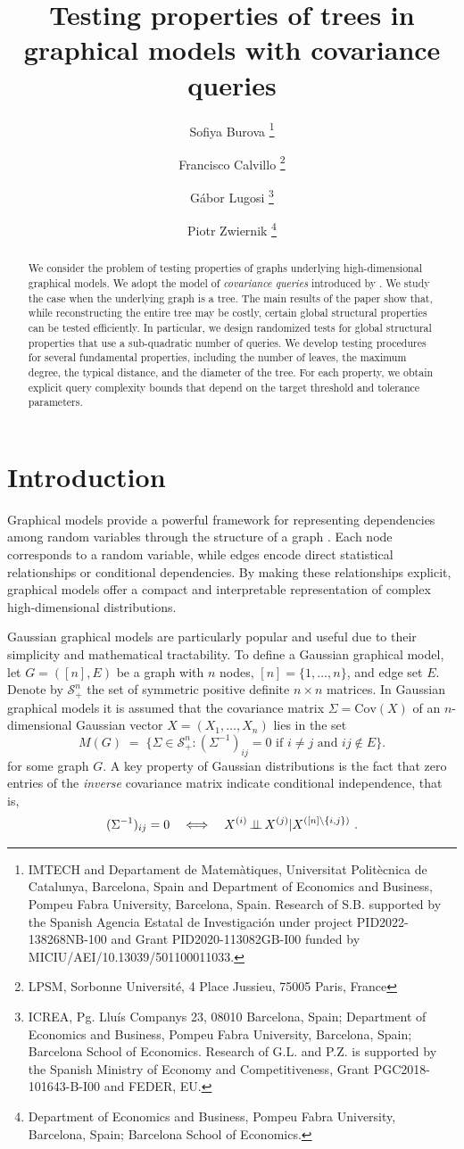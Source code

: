 \documentclass[12pt]{article}
\title{Testing properties of trees in graphical models with covariance queries}
\author{Sofiya Burova 
\thanks{
IMTECH and Departament de Matem\`atiques,  Universitat Polit\`ecnica de Catalunya, Barcelona, Spain 
and 
Department of Economics and Business, Pompeu Fabra University, Barcelona, Spain.
Research of S.B. supported by the Spanish Agencia Estatal de Investigaci\'on under project PID2022-138268NB-100 and Grant PID2020-113082GB-I00 funded by MICIU/AEI/10.13039/501100011033.}
\and Francisco Calvillo 
\thanks{LPSM, Sorbonne Université, 4 Place Jussieu, 75005 Paris, France}
\and Gábor Lugosi  
\thanks{ICREA, Pg. Llu\'is Companys 23, 08010 Barcelona, Spain;
Department of Economics and Business, Pompeu Fabra University, Barcelona, Spain; 
Barcelona School of Economics.
Research of G.L. and P.Z. is supported by the Spanish Ministry of Economy and Competitiveness, Grant PGC2018-101643-B-I00 and FEDER, EU.}
\and Piotr Zwiernik
\thanks{Department of Economics and Business, Pompeu Fabra University, Barcelona, Spain; 
Barcelona School of Economics.}
}
\date{}
\newcommand{\cov}{\mathrm{Cov}}
\newcommand{\cip}{\mbox{\,$\perp\!\!\!\perp$\,}}
\newcommand{\indep}{\cip}
\begin{document}
\maketitle
\begin{abstract}
We consider the problem of testing properties of graphs underlying high-dimensional graphical models. We adopt the model of \emph{covariance queries} introduced by \cite{lugosi2021learning}. 
We study the case when the underlying graph is a tree. 
The main results of the paper show that, while reconstructing the entire tree may be costly, certain global structural properties can be tested efficiently. 
In particular, we design randomized tests for global structural properties that  use a sub-quadratic number of queries. We develop testing procedures for several fundamental properties, including the number of leaves, the maximum degree, the typical distance, and the diameter of the tree. 
For each property, we obtain explicit query complexity bounds that depend on the target threshold and tolerance parameters. 

\end{abstract}

\section{Introduction}


Graphical models provide a powerful framework for representing dependencies among random variables through the structure of a graph \citep{lauritzen1996graphical}. Each node corresponds to a random variable, while edges encode direct statistical relationships or conditional dependencies. By making these relationships explicit, graphical models offer a compact and interpretable representation of complex high-dimensional distributions. 

Gaussian graphical models are particularly popular and useful due to their simplicity and mathematical tractability. To define a Gaussian graphical model, let $G=([n],E)$ be a graph with $n$ nodes, $[n]=\{1,\ldots,n\}$, and edge set $E$. Denote by $\mathcal{S}^n_+$ the set of symmetric positive definite $n\times n$ matrices.
In Gaussian graphical models it is assumed that the covariance matrix $\Sigma=\cov(X)$ of an $n$-dimensional Gaussian vector $X=(X_1,\ldots,X_n)$ lies
in the set
\begin{equation*}
M(G)\;=\;\{\Sigma\in \mathcal{S}^n_+: (\Sigma^{-1})_{ij}=0 \mbox{ if }i\neq j\mbox{ and }ij\notin E\}.	
\end{equation*}
for some graph $G$. A key property of Gaussian distributions is the fact that
zero entries of the \emph{inverse} covariance matrix indicate conditional independence, that is,
$$
(\Sigma^{-1})_{ij}=0\quad\Longleftrightarrow\quad  X^{(i)}\indep X^{(j)}|X^{([n]\setminus \{i,j\})}~.
$$
\end{document}

